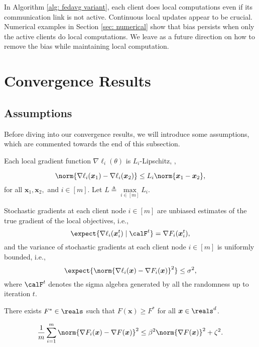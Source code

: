 \documentclass[letterpaper, 10 pt, conference]{ieeeconf}  %
\newcommand{\x}{{\bm x}}
\begin{document}
\begin{remark}
In Algorithm \ref{alg: fedavg variant},  each client does local computations even if its communication link is not active. 
Continuous local updates appear to be crucial. 
Numerical examples in Section \ref{sec: numerical} show that bias persists when only the active clients do local computations. 
We leave as a future direction on how to remove the bias while maintaining local computation. 
\end{remark}



\section{Convergence Results}
\label{sec: convergence results}
\subsection{Assumptions}
Before diving into our convergence results, we will introduce some assumptions, which are commented towards the end of this subsection. 
\begin{assumption}[Smoothness]
\label{ass: 2 smmothness}
Each local gradient function
$\nabla \ell_{i}(\theta)$ is $L_i$-Lipschitz, \ie,

\[
    \norm{\nabla \ell_{i}(\x_1)-\nabla \ell_{i}(\x_2)}\le L_i \norm{\x_1-\x_2},
\]
for all $\x_1, \x_2,$ and $i\in[m]$. 
Let $L \triangleq \max\limits_{i\in[m]} L_i$. 
\end{assumption}
\begin{assumption}
\label{ass: bounded variance client-wise}
Stochastic gradients at each client node $i\in[m]$ are unbiased estimates of the true gradient of the local objectives, i.e.,  
\[
\expect{\nabla \ell_i(\x_i^t) \mid \calF^{t}}=\nabla F_i(\x_i^t),  
\]
and the variance of stochastic gradients at each client node $i\in[m]$ is uniformly bounded, i.e., 
\[
\expect{\norm{\nabla \ell_i(\x)-\nabla F_i(\x)}^2}\le\sigma^2, 
\]
where $\calF^{t}$ denotes the sigma algebra generated by all the randomness up to iteration $t$. 
\end{assumption}
\begin{assumption}
\label{ass: lower bounds}
There exists $F^*\in \reals$ such that $F(\x)\ge F^*$ for all $\x\in \reals^d$. 
\end{assumption}
\begin{assumption}
\label{ass: bounded similarity}
\begin{align*}
    \frac{1}{m}\sum_{i=1}^m \norm{\nabla F_i(\x)- \nabla F(\x)}^2 \le \beta^2 \norm{\nabla F(\x)}^2+ \zeta^2. 
\end{align*}
\end{assumption}
\end{document}
